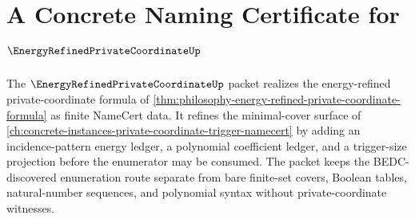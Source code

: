 \chapter{A Concrete Naming Certificate for $\EnergyRefinedPrivateCoordinateUp$}
\label{ch:concrete-instances-energy-refined-private-coordinate-namecert}

The $\EnergyRefinedPrivateCoordinateUp$ packet realizes the energy-refined private-coordinate formula of \autoref{thm:philosophy-energy-refined-private-coordinate-formula} as finite NameCert data. It refines the minimal-cover surface of \autoref{ch:concrete-instances-private-coordinate-trigger-namecert} by adding an incidence-pattern energy ledger, a polynomial coefficient ledger, and a trigger-size projection before the enumerator may be consumed. The packet keeps the BEDC-discovered enumeration route separate from bare finite-set covers, Boolean tables, natural-number sequences, and polynomial syntax without private-coordinate witnesses.



